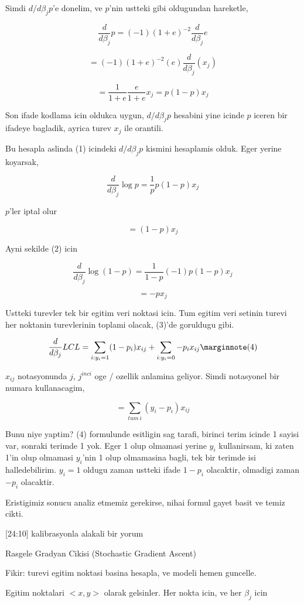 \documentclass[12pt,fleqn]{article}\usepackage{../common}
\begin{document}
Simdi  $d/d\beta_j p$'e donelim, ve $p$'nin ustteki gibi oldugundan
hareketle,

$$ \frac{ d}{d\beta_j}p = (-1)(1+e)^{-2} \frac{ d}{d\beta_j}e $$


$$ = (-1)(1+e)^{-2} (e) \frac{ d}{d\beta_j}(x_j) $$

$$ = \frac{ 1}{1+e} \frac{ e}{1+e}x_j = p(1-p)x_j$$


Son ifade kodlama icin oldukca uygun, $d/d\beta_j p$ hesabini yine icinde
$p$ iceren bir ifadeye bagladik, ayrica turev $x_j$ ile orantili. 

Bu hesapla aslinda (1) icindeki $d/d\beta_j p$ kismini hesaplamis
olduk. Eger yerine koyarsak, 

$$ 
\frac{d}{d\beta_j}\log p = \frac{1}{p}p(1-p)x_j 
$$

$p$'ler iptal olur

$$ 
= (1-p)x_j 
$$

Ayni sekilde (2) icin 

$$ 
\frac{d}{d\beta_j}\log (1-p) = \frac{1}{1-p}(-1) p(1-p)x_j 
$$

$$ 
 =  -px_j 
$$


Ustteki turevler tek bir egitim veri noktasi icin. Tum egitim veri setinin
turevi her noktanin turevlerinin toplami olacak, (3)'de goruldugu gibi.

$$ \frac{d}{d\beta_j} LCL = 
\sum _{i: y_i = 1} (1-p_i)x_{ij} + 
\sum _{i: y_i = 0} -p_i x_{ij}  
\mlabel{4}
$$

$x_{ij}$ notasyonunda $j$, $j^{inci}$ oge / ozellik anlamina geliyor. Simdi notasyonel bir numara kullanacagim, 

$$ = \sum _{tum \ i} (y_i - p_i)x_{ij} $$

Bunu niye yaptim? (4) formulunde esitligin sag tarafi, birinci terim icinde
1 sayisi var, sonraki terimde 1 yok. Eger 1 olup olmamasi yerine $y_i$
kullanirsam, ki zaten 1'in olup olmamasi $y_i$'nin 1 olup olmamasina bagli,
tek bir terimde isi halledebilirim. $y_i=1$ oldugu zaman ustteki ifade
$1-p_i$ olacaktir, olmadigi zaman $-p_i$ olacaktir. 

Eristigimiz sonucu analiz etmemiz gerekirse, nihai formul gayet basit ve
temiz cikti. 

[24:10] kalibrasyonla alakali bir yorum

Rasgele Gradyan Cikisi (Stochastic Gradient Ascent)

Fikir: turevi egitim noktasi basina hesapla, ve modeli hemen guncelle. 

Egitim noktalari $<x,y>$ olarak gelsinler. Her nokta icin, ve her $\beta_j$
icin
\end{document}
